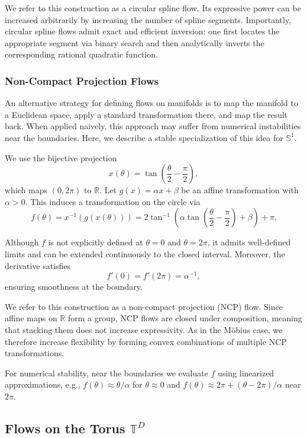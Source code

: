 \documentclass{article}
\begin{document}
We refer to this construction as a circular spline flow. Its expressive power can be increased arbitrarily by increasing the number of spline segments. Importantly, circular spline flows admit exact and efficient inversion: one first locates the appropriate segment via binary search and then analytically inverts the corresponding rational quadratic function.


\subsubsection{Non-Compact Projection Flows}\label{sec:ncp}

An alternative strategy for defining flows on manifolds is to map the manifold to a Euclidean space, apply a standard transformation there, and map the result back. When applied naively, this approach may suffer from numerical instabilities near the boundaries. Here, we describe a stable specialization of this idea for $\mathbb{S}^1$.

We use the bijective projection
\[
x(\theta) = \tan\!\left( \frac{\theta}{2} - \frac{\pi}{2} \right),
\]
which maps $(0, 2\pi)$ to $\mathbb{R}$. Let $g(x) = \alpha x + \beta$ be an affine transformation with $\alpha > 0$. This induces a transformation on the circle via
\begin{equation}
f(\theta) = x^{-1}( g(x(\theta)) ) = 2 \tan^{-1}\!\left( \alpha \tan\!\left( \frac{\theta}{2} - \frac{\pi}{2} \right) + \beta \right) + \pi.
\end{equation}

Although $f$ is not explicitly defined at $\theta = 0$ and $\theta = 2\pi$, it admits well-defined limits and can be extended continuously to the closed interval. Moreover, the derivative satisfies
\[
f'(0) = f'(2\pi) = \alpha^{-1},
\]
ensuring smoothness at the boundary.

We refer to this construction as a non-compact projection (NCP) flow. Since affine maps on $\mathbb{R}$ form a group, NCP flows are closed under composition, meaning that stacking them does not increase expressivity. As in the Möbius case, we therefore increase flexibility by forming convex combinations of multiple NCP transformations.

For numerical stability, near the boundaries we evaluate $f$ using linearized approximations, e.g., $f(\theta) \approx \theta / \alpha$ for $\theta \approx 0$ and $f(\theta) \approx 2\pi + (\theta - 2\pi)/\alpha$ near $2\pi$.

\subsection{Flows on the Torus \texorpdfstring{$\mathbb{T}^D$}{TD}}
\label{sec:flows:torus}
\end{document}
